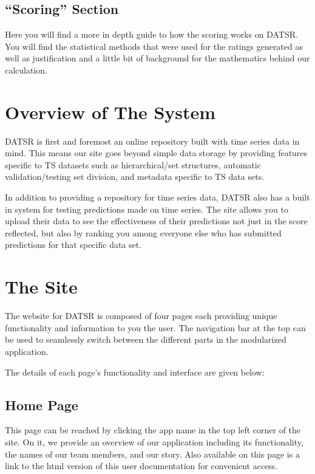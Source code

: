 \documentclass[letterpaper,10pt,english,openany,oneside]{sphinxmanual}
\begin{document}
\section{“Scoring” Section}
\label{\detokenize{getting_started:scoring-section}}
\sphinxAtStartPar
Here you will find a more in depth guide to how the scoring works on DATSR. You will find the statistical methods that were used for the ratings generated as well as justification and a little bit of background for the mathematics behind our calculation.

\sphinxstepscope


\chapter{Overview of The System}
\label{\detokenize{overview:overview-of-the-system}}\label{\detokenize{overview::doc}}
\sphinxAtStartPar
DATSR is first and foremost an online repository built with time series data in mind. This means our site goes beyond simple data storage by providing features specific to TS datasets such as hierarchical/set structures, automatic validation/testing set division, and metadata specific to TS data sets.

\sphinxAtStartPar
In addition to providing a repository for time series data, DATSR also has a built in system for testing predictions made on time series. The site allows you to upload their data to see the effectiveness of their predictions not just in the score reflected, but also by ranking you among everyone else who has submitted predictions for that specific data set.

\sphinxstepscope


\chapter{The Site}
\label{\detokenize{site:the-site}}\label{\detokenize{site:site}}\label{\detokenize{site::doc}}
\sphinxAtStartPar
The website for DATSR is composed of four pages each providing unique functionality and information to you the user. The navigation bar at the top can be used to seamlessly switch between the different parts in the modularized application.

\sphinxAtStartPar
The details of each page’s functionality and interface are given below:


\section{Home Page}
\label{\detokenize{site:home-page}}
\sphinxAtStartPar
This page can be reached by clicking the app name in the top left corner of the site. On it, we provide an overview of our application including its functionality, the names of our team members, and our story. Also available on this page is a link to the html version of this user documentation for convenient access.
\end{document}
